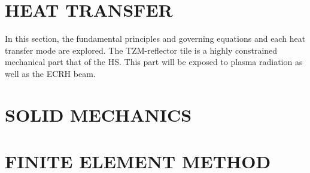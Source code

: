 \section{HEAT TRANSFER}
\normalsize{In this section, the fundamental principles and governing equations and each heat transfer mode are explored. The TZM-reflector tile is a highly constrained mechanical part that of the \acrshort{HS}. This part will be exposed to plasma radiation as well as the \acrshort{ECRH} beam.}




\section{SOLID MECHANICS}

\section{FINITE ELEMENT METHOD}

